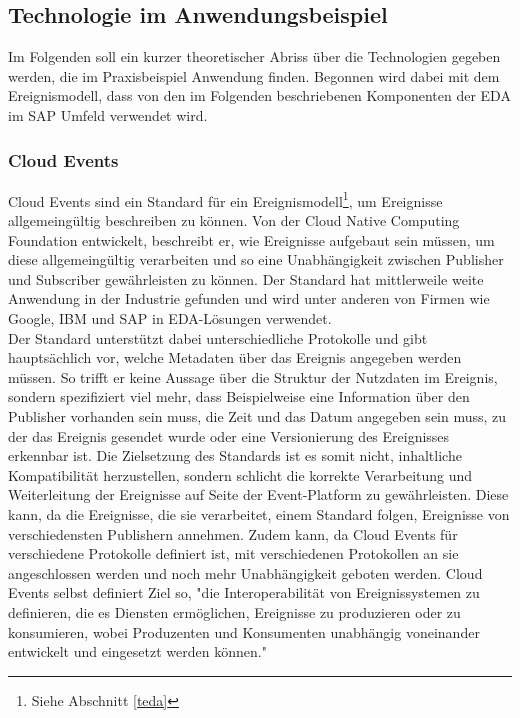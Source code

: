 \subsection{Technologie im Anwendungsbeispiel}
Im Folgenden soll ein kurzer theoretischer Abriss über die Technologien gegeben werden, die im Praxisbeispiel Anwendung finden. Begonnen wird dabei mit dem Ereignismodell, dass von den im Folgenden beschriebenen Komponenten der \ac{EDA} im SAP Umfeld verwendet wird.

\subsubsection*{Cloud Events}
\label{cloudev}
Cloud Events sind ein Standard für ein Ereignismodell\footnote{Siehe Abschnitt \ref*{teda}}, um Ereignisse allgemeingültig beschreiben zu können. Von der Cloud Native Computing Foundation entwickelt, beschreibt er, wie Ereignisse aufgebaut sein müssen, um diese allgemeingültig verarbeiten und so eine Unabhängigkeit zwischen Publisher und Subscriber gewährleisten zu können. Der Standard hat mittlerweile weite Anwendung in der Industrie gefunden und wird unter anderen von Firmen wie Google, IBM und SAP in \ac{EDA}-Lösungen verwendet. \cite[Vgl. ]{cloudevent} \\
Der Standard unterstützt dabei unterschiedliche Protokolle und gibt hauptsächlich vor, welche Metadaten über das Ereignis angegeben werden müssen. So trifft er keine Aussage über die Struktur der Nutzdaten im Ereignis, sondern spezifiziert viel mehr, dass Beispielweise eine Information über den Publisher vorhanden sein muss, die Zeit und das Datum angegeben sein muss, zu der das Ereignis gesendet wurde oder eine Versionierung des Ereignisses erkennbar ist. Die Zielsetzung des Standards ist es somit nicht, inhaltliche Kompatibilität herzustellen, sondern schlicht die korrekte Verarbeitung und Weiterleitung der Ereignisse auf Seite der Event-Platform zu gewährleisten. Diese kann, da die Ereignisse, die sie verarbeitet, einem Standard folgen, Ereignisse von verschiedensten Publishern annehmen. Zudem kann, da Cloud Events für verschiedene Protokolle definiert ist, mit verschiedenen Protokollen an sie angeschlossen werden und noch mehr Unabhängigkeit geboten werden. Cloud Events selbst definiert Ziel so, "die Interoperabilität von Ereignissystemen zu definieren, die es Diensten ermöglichen, Ereignisse zu produzieren oder zu konsumieren, wobei Produzenten und Konsumenten unabhängig voneinander entwickelt und eingesetzt werden können."\ \cite[Vgl. ]{cloudeventprimer}

